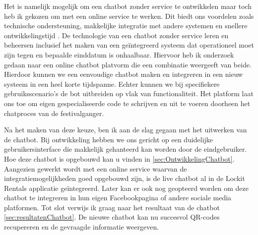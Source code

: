 Het is namelijk mogelijk om een chatbot zonder service te ontwikkelen maar toch heb ik gekozen om met een online service te werken. Dit biedt ons voordelen zoals technische ondersteuning, makkelijke integratie met andere systemen en snellere ontwikkelingstijd \autocite{Mercir2022} \autocite{folstad2021investigating}. De technologie van een chatbot zonder service leren en beheersen inclusief het maken van een geïntegreerd systeem dat operationeel moet zijn tegen en bepaalde einddatum is onhaalbaar. Hiervoor heb ik onderzoek gedaan naar een online chatbot platvorm die een combinatie weergeeft van beide. Hierdoor kunnen we een eenvoudige chatbot maken en integreren in een nieuw systeem in een heel korte tijdspanne. Echter kunnen we bij specifiekere gebruiksscenario’s de bot uitbreiden op vlak van functionaliteit. Het platform laat ons toe om eigen gespecialiseerde code te schrijven en uit te voeren doorheen het chatproces van de festivalganger. 

Na het maken van deze keuze, ben ik aan de slag gegaan met het uitwerken van de chatbot. Bij ontwikkeling hebben we ons gericht op een duidelijke gebruikersinterface die makkelijk gehanteerd kan worden door de eindgebruiker. Hoe deze chatbot is opgebouwd kan u vinden in \ref{sec:OntwikkelingChatbot}. Aangezien gewerkt wordt met een online service waarvan de integratiemogelijkheden goed opgebouwd zijn, is de live chatbot al in de Lockit Rentals applicatie geïntegreerd. Later kan er ook nog geopteerd worden om deze chatbot te integreren in hun eigen Facebookpagina of andere sociale media platformen. 
Tot slot verwijs ik graag naar het resultaat van de chatbot \ref{sec:resultatenChatbot}. De nieuwe chatbot kan nu succesvol QR-codes recupereren en de gevraagde informatie weergeven.





